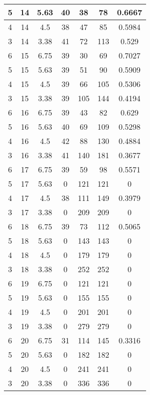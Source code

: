 \documentclass[letterpaper, 12pt]{article}
\begin{document}
\begin{longtable}{|c|c|c|c|c|c|c|}
\hline
5 & 14 & 5.63 & 40 & 38 & 78 & 0.6667 \\
\hline
4 & 14 & 4.5 & 38 & 47 & 85 & 0.5984 \\
\hline
3 & 14 & 3.38 & 41 & 72 & 113 & 0.529 \\
\hline
6 & 15 & 6.75 & 39 & 30 & 69 & 0.7027 \\
\hline
5 & 15 & 5.63 & 39 & 51 & 90 & 0.5909 \\
\hline
4 & 15 & 4.5 & 39 & 66 & 105 & 0.5306 \\
\hline
3 & 15 & 3.38 & 39 & 105 & 144 & 0.4194 \\
\hline
6 & 16 & 6.75 & 39 & 43 & 82 & 0.629 \\
\hline
5 & 16 & 5.63 & 40 & 69 & 109 & 0.5298 \\
\hline
4 & 16 & 4.5 & 42 & 88 & 130 & 0.4884 \\
\hline
3 & 16 & 3.38 & 41 & 140 & 181 & 0.3677 \\
\hline
6 & 17 & 6.75 & 39 & 59 & 98 & 0.5571 \\
\hline
5 & 17 & 5.63 & 0 & 121 & 121 & 0 \\
\hline
4 & 17 & 4.5 & 38 & 111 & 149 & 0.3979 \\
\hline
3 & 17 & 3.38 & 0 & 209 & 209 & 0 \\
\hline
6 & 18 & 6.75 & 39 & 73 & 112 & 0.5065 \\
\hline
5 & 18 & 5.63 & 0 & 143 & 143 & 0 \\
\hline
4 & 18 & 4.5 & 0 & 179 & 179 & 0 \\
\hline
3 & 18 & 3.38 & 0 & 252 & 252 & 0 \\
\hline
6 & 19 & 6.75 & 0 & 121 & 121 & 0 \\
\hline
5 & 19 & 5.63 & 0 & 155 & 155 & 0 \\
\hline
4 & 19 & 4.5 & 0 & 201 & 201 & 0 \\
\hline
3 & 19 & 3.38 & 0 & 279 & 279 & 0 \\
\hline
6 & 20 & 6.75 & 31 & 114 & 145 & 0.3316 \\
\hline
5 & 20 & 5.63 & 0 & 182 & 182 & 0 \\
\hline
4 & 20 & 4.5 & 0 & 241 & 241 & 0 \\
\hline
3 & 20 & 3.38 & 0 & 336 & 336 & 0 \\
\hline
\end{longtable}
\end{document}

